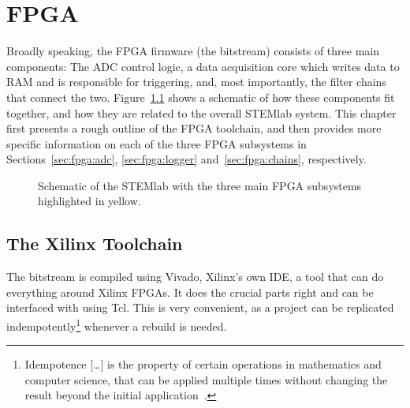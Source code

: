 %
%
\chapter{FPGA} %
\label{ch:fpga}
%
%
Broadly speaking,  the FPGA  firmware (the bitstream)  consists of  three main
components:  The ADC control logic, a  data acquisition core which writes data
to  RAM  and  is  responsible  for  triggering,  and,  most  importantly,  the
filter chains  that connect the two.   Figure~\ref{fig:fpga:structure} shows a
schematic of  how these components fit  together, and how they  are related to
the overall STEMlab system. This chapter first presents a rough outline of the
FPGA toolchain,  and then provides  more specific  information on each  of the
three  FPGA subsystems  in Sections~\ref{sec:fpga:adc},  \ref{sec:fpga:logger}
and~\ref{sec:fpga:chains}, respectively.

\begin{figure}
    \centering
    
    \caption[System Schematic]{%
        Schematic  of  the  STEMlab  with   the  three  main  FPGA  subsystems
        highlighted in yellow.%
    }
    \label{fig:fpga:structure}
\end{figure}
%
%
\section{The Xilinx Toolchain} %
\label{sec:fpga:toolchain}

The bitstream is compiled  using Vivado, Xilinx's own IDE, a  tool that can do
everything around  Xilinx FPGAs. It does  the crucial  parts right and  can be
interfaced  with using  Tcl. This  is very  convenient, as  a  project can  be
replicated indempotently\footnote{%
    Idempotence [\ldots] is the property  of certain operations in mathematics
    and computer science, that can  be applied multiple times without changing
    the result beyond the initial application~\cite{wiki:idempotence}.%
}%
whenever a rebuild is needed.

